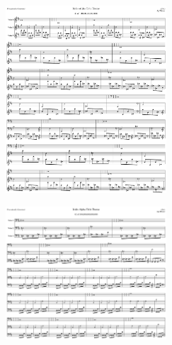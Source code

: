 \begin{figure}[H]                                             
{                                                             
  \setlength{\tabcolsep}{3.0pt}                               
  \setlength\cmidrulewidth{\heavyrulewidth} %
    \begin{subfigure}{0.5\textwidth}                            
  \includegraphics[width=6cm]{music/title_no_41_page_1001.png}%
    \end{subfigure}                                             
  \begin{subfigure}{0.5\textwidth}                            
  \includegraphics[width=6cm]{music/title_no_42_page_1001.png}%
    \end{subfigure}                                             
}                                                             
\end{figure}                                                  


